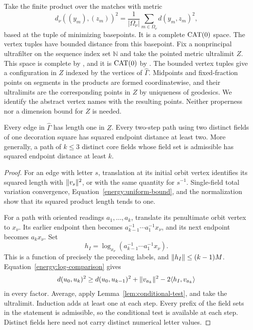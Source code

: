 Take the finite product over the matches with metric
\begin{equation}\label{energy:product-metric}
 d_\nu((y_m),(z_m))^2
 =\frac1{|\Omega_\nu|}\sum_{m\in\Omega_\nu}d(y_m,z_m)^2,
\end{equation}
based at the tuple of minimizing basepoints.  It is a complete
$\operatorname{CAT}(0)$ space.  The vertex tuples have bounded distance from this
basepoint.  Fix a nonprincipal ultrafilter on the sequence index set
$\mathbb N$ and take the pointed metric ultralimit $Z$.  This space is
complete by \cite[Lemma~I.5.53]{BH1999}, and it is $\operatorname{CAT}(0)$ by
\cite[Corollary~II.3.10(2)]{BH1999}.  The bounded vertex tuples give a
configuration in $Z$ indexed by the vertices of $\widehat\Gamma$.
Midpoints
and fixed-fraction points on segments in the products are formed
coordinatewise, and their ultralimits are the corresponding points
in $Z$ by uniqueness of geodesics.  We identify the abstract vertex
names with the resulting points.  Neither properness nor a dimension
bound for $Z$ is needed.

\newpage
\begin{lemma}\label{energy:path-bounds}
Every edge in $\widehat\Gamma$ has length one in $Z$.  Every two-step
path using two distinct fields of one decoration square has squared
endpoint distance at least two.  More generally, a path of $k\le3$
distinct core fields whose field set is admissible has squared
endpoint distance at least $k$.
\end{lemma}

\begin{proof}
For an edge with letter $s$, translation at its initial orbit vertex
identifies its squared length with $\lVert v_s\rVert^2$, or with the same
quantity for $s^{-1}$.  Single-field total variation convergence,
Equation~\eqref{energy:uniform-bound}, and the normalization show that
its squared product length tends to one.

For a path with oriented readings $a_1,\ldots,a_k$, translate its
penultimate orbit vertex to $x_\nu$.  Its earlier endpoint then becomes
$a_{k-1}^{-1}\cdots a_1^{-1}x_\nu$, and its next endpoint becomes
$a_kx_\nu$.  Set
\[
 h_I=\log_{x_\nu}(a_{k-1}^{-1}\cdots a_1^{-1}x_\nu).
\]
This is a function of precisely the preceding labels, and
$\lVert h_I\rVert\le(k-1)M$.  Equation~\eqref{energy:log-comparison} gives
\[
 d(u_0,u_k)^2\ge d(u_0,u_{k-1})^2+\lVert v_{a_k}\rVert^2
       -2\langle h_I,v_{a_k}\rangle
\]
in every factor.  Average, apply Lemma~\ref{lem:conditional-test},
and take the ultralimit.  Induction adds at least one at each step.
Every prefix of the field sets in the statement is admissible, so
the conditional test is available at each step.  Distinct fields
here need not carry distinct numerical letter values.
\end{proof}

